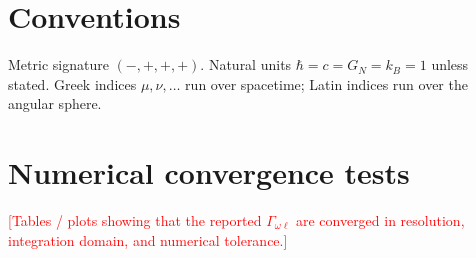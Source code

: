 \documentclass[
  aps,
  prd,
  preprint,      %
  superscriptaddress,
  nofootinbib,
  amsmath,
  amssymb,
  floatfix,
]{revtex4-2}
\newcommand{\GN}{G_{\!N}}
\begin{document}
\printbibliography

\appendix

\section{Conventions}
\label{app:conventions}

Metric signature $(-,+,+,+)$. Natural units $\hbar = c = \GN = k_B = 1$ unless
stated. Greek indices $\mu,\nu,\dots$ run over spacetime; Latin indices run
over the angular sphere.

\section{Numerical convergence tests}
\label{app:convergence}

\textcolor{red}{[Tables / plots showing that the reported $\Gamma_{\omega\ell}$
are converged in resolution, integration domain, and numerical tolerance.]}
\end{document}
